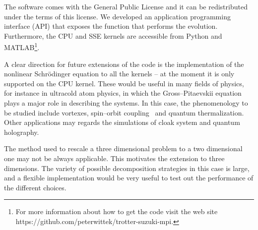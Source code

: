 The software comes with the General Public License and it can be redistributed under the terms of this license. We developed an application programming interface (API) that exposes the function that performs the evolution. Furthermore, the CPU and SSE kernels are accessible from Python and MATLAB\footnote{For more information about how to get the code visit the web site https://github.com/peterwittek/trotter-suzuki-mpi.}.

A clear direction for future extensions of the code is the implementation of the nonlinear Schr\"odinger equation to all the kernels -- at the moment it is only supported on the CPU kernel. These would be useful in many fields of physics, for instance in ultracold atom physics, in which the Gross--Pitaevskii equation plays a major role in describing the systems. In this case, the phenomenology to be studied include vortexes, spin--orbit coupling~\citep{GS13} and quantum thermalization. Other applications may regards the simulations of cloak system and quantum holography.

The method used to rescale a three dimensional problem to  a two dimensional one may not be always applicable. This motivates the extension to three dimensions. The variety of possible decomposition strategies in this case is large, and a flexible implementation would be very useful to test out the performance of the different choices.